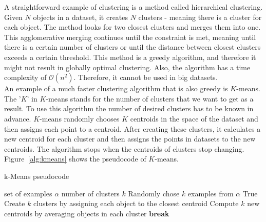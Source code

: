 \documentclass[thesis=B,english]{FITthesis}[2012/10/20]
\begin{document}
A straightforward example of clustering is a method called hierarchical clustering.
Given $N$ objects in a dataset, it creates $N$ clusters - meaning there is a cluster for each object.
The method looks for two closest clusters and merges them into one.                  
This agglomerative merging continues until the constraint is met, meaning until there is a certain number of clusters or until the distance between closest clusters exceeds a certain threshold.
This method is a greedy algorithm, and therefore it might not result in globally optimal clustering.
Also, the algorithm has a time complexity of $\mathcal{O}(n^2)$. 
Therefore, it cannot be used in big datasets. \\
                                                                                  
An example of a much faster clustering algorithm that is also greedy is $K$-means. 
The '$K$' in $K$-means stands for the number of clusters that we want to get as a result.
To use this algorithm the number of desired clusters has to be known in advance.
$K$-means randomly chooses $K$ centroids in the space of the dataset and then assigns each point to a centroid.
After creating these clusters, it calculates a new centroid for each cluster and then assigns the points in datasets to the new centroids.
The algorithm stops when the centroids of clusters stop changing.                 
Figure~\ref{alg:kmeans} shows the pseudocode of $K$-means.                                         
\begin{algorithm}\label{alg:kmeans}                                                                 
    \caption{k-Means pseudocode}                                                  
    \label{k_mean_pseudocode}                                                     
    \begin{algorithmic}[1]                                                        
        \INPUT set of examples $\alpha$  number of clusters $k$                   
        \STATE Randomly chose $k$ examples from $\alpha$                          
        \WHILE True                                                               
            \STATE Create $k$ clusters by assigning each object to the closest centroid
            \STATE Compute $k$ new centroids by averaging objects in each cluster 
                \STATE \textbf{break}                                             
            \ENDIF                                                                
        \ENDWHILE                                                                 
    \end{algorithmic}                                                             
\end{algorithm}                                                                   
                                                                                  
\end{document}
